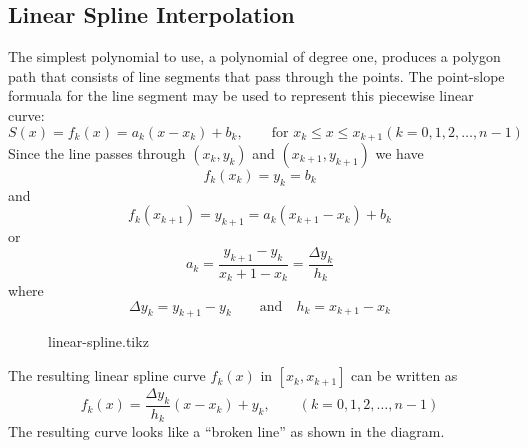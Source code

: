 \documentclass[12pt,class=book,crop=false]{standalone}
\begin{document}
\subsection{Linear Spline Interpolation}
The simplest polynomial to use, a polynomial of degree one, produces a polygon path that consists of line segments that pass through the points. The point-slope formuala for the line segment may be used to represent this piecewise linear curve:
\[
	S(x)=f_k (x)=a_k (x-x_k)+b_k,\qquad \text{for } x_k \leq x \leq x_{k+1}(k = 0, 1, 2,\dots, n-1)
\]
Since the line passes through $ (x_k, y_k) $ and $ (x_{k+1}, y_{k+1}) $ we have
\[
	f_k (x_k)=y_k=b_k
\]
and
\[
	f_k (x_{k+1})=y_{k+1}=a_k (x_{k+1}-x_k)+b_k
\]
or
\[
	a_k=\frac{y_{k+1}-y_k}{x_k+1-x_k}=\frac{ \Delta y_k}{h_k}
\]
where
\[
	\Delta y_k=y_{k+1}-y_k \qquad \text{and}\quad h_k=x_{k+1}-x_k
\]
\begin{figure}[H]
	\centering
	{linear-spline.tikz}
\end{figure}
The resulting linear spline curve $ f_k (x) $ in $ [x_k,x_{k+1}] $ can be written as
\[
	f_k (x)=\frac{\Delta y_k}{h_k} (x-x_k)+y_k,\qquad (k=0,1,2,\dots,n-1)
\]
The resulting curve looks like a ``broken line'' as shown in the diagram.
\end{document}
